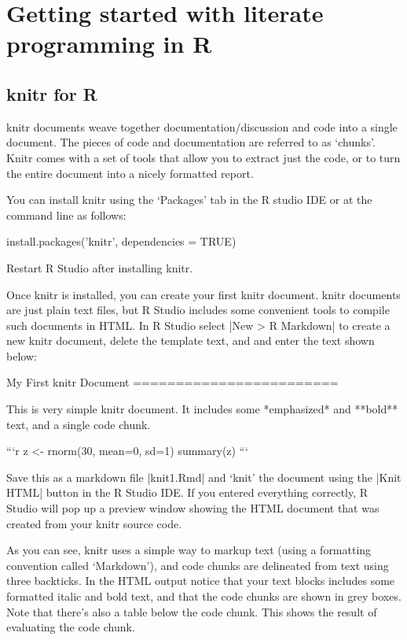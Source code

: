 
\newpage
\section{Getting started with literate programming in R}

\subsection{knitr for R}

knitr documents weave together documentation/discussion and code into a
single document. The pieces of code and documentation are referred to as
`chunks'. Knitr comes with a set of tools that allow you to extract just the
code, or to turn the entire document into a nicely formatted report.

You can install knitr using the `Packages' tab in the R studio IDE or at the command line as follows:
%
\begin{R}
install.packages('knitr', dependencies = TRUE)
\end{R}
%
Restart R Studio after installing knitr.

Once knitr is installed, you can create your first knitr document. knitr documents are just plain text files, but R Studio includes some convenient tools to compile such documents in HTML.  In R Studio select |New > R Markdown| to create a new knitr document, delete the template text, and and enter the text shown below: 

\begin{noindentcodeblock}

My First knitr Document
========================

This is very simple knitr document. It includes some *emphasized* and **bold** text, and a single code chunk.

```{r}
z <- rnorm(30, mean=0, sd=1)
summary(z)
```

\end{noindentcodeblock}

Save this as a markdown file |knit1.Rmd| and `knit' the document using the |Knit HTML| button in the R Studio IDE.  If you entered everything correctly, R Studio will pop up a preview window showing the HTML document that was created from your knitr source code.

As you can see, knitr uses a simple way to markup text (using a formatting convention called `Markdown'), and code chunks are delineated from text using three backticks. In the HTML output notice that your text blocks includes some formatted italic and bold text, and that the code chunks are shown in grey boxes.  Note that there's also a table below the code chunk. This shows the result of evaluating the code chunk. 

